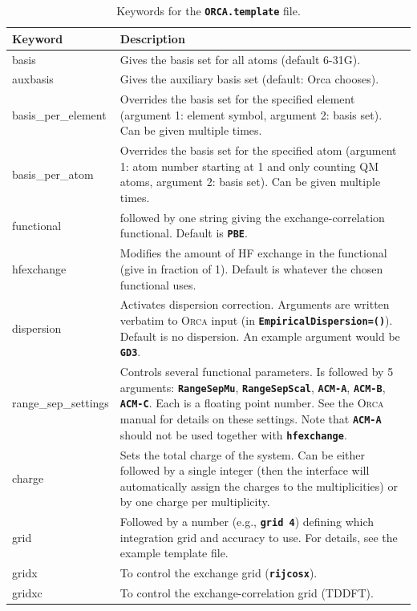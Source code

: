 \documentclass[a4paper,10pt,DIV=15,openany]{scrbook}
\newcommand{\ttt}[1]{\textbf{\texttt{#1}}}
\begin{document}
\begin{table}
  \centering
  \caption{Keywords for the \ttt{ORCA.template} file.}
  \label{tab:orca_temp}
  \small
  \begin{tabular}{>{\ttfamily}lp{12cm}}
  \hline
  Keyword       &Description\\
  \hline
basis                   &Gives the basis set for all atoms (default 6-31G).
\\
auxbasis                &Gives the auxiliary basis set (default: Orca chooses).
\\
basis\_per\_element     &Overrides the basis set for the specified element (argument 1: element symbol, argument 2: basis set). Can be given multiple times.
\\
basis\_per\_atom        &Overrides the basis set for the specified atom (argument 1: atom number starting at 1 and only counting QM atoms, argument 2: basis set). Can be given multiple times.
\\
functional              &followed by one string giving the exchange-correlation functional. Default is \ttt{PBE}.
\\
hfexchange              &Modifies the amount of HF exchange in the functional (give in fraction of 1). Default is whatever the chosen functional uses.
\\
dispersion              &Activates dispersion correction. Arguments are written verbatim to \textsc{Orca} input (in \ttt{EmpiricalDispersion=()}). Default is no dispersion. An example argument would be \ttt{GD3}.
\\
range\_sep\_settings    &Controls several functional parameters. Is followed by 5 arguments: \ttt{RangeSepMu}, \ttt{RangeSepScal}, \ttt{ACM-A}, \ttt{ACM-B}, \ttt{ACM-C}. Each is a floating point number. See the \textsc{Orca} manual for details on these settings. Note that \ttt{ACM-A} should not be used together with \ttt{hfexchange}.
\\
charge                  &Sets the total charge of the system. Can be either followed by a single integer (then the interface will automatically assign the charges to the multiplicities) or by one charge per multiplicity. 
\\
grid                    &Followed by a number (e.g., \ttt{grid 4}) defining which integration grid and accuracy to use. For details, see the example template file.
\\
gridx                   &To control the exchange grid (\ttt{rijcosx}).
\\
gridxc                  &To control the exchange-correlation grid (TDDFT).

\end{tabular}
\end{table}
\end{document}
